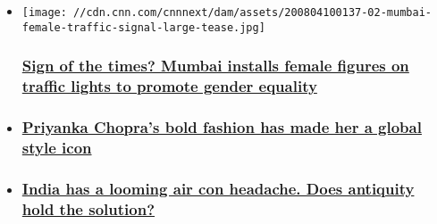 \begin{itemize}
\item
  \href{/style/article/mumbai-traffic-light-women-intl-hnk-scli/index.html}{}

  \texttt{[image: //cdn.cnn.com/cnnnext/dam/assets/200804100137-02-mumbai-female-traffic-signal-large-tease.jpg]}

  \hypertarget{sign-of-the-times-mumbai-installs-female-figures-on-traffic-lights-to-promote-gender-equality}{%
  \subsubsection{\texorpdfstring{\href{/style/article/mumbai-traffic-light-women-intl-hnk-scli/index.html}{Sign
  of the times? Mumbai installs female figures on traffic lights to
  promote gender
  equality}}{Sign of the times? Mumbai installs female figures on traffic lights to promote gender equality}}\label{sign-of-the-times-mumbai-installs-female-figures-on-traffic-lights-to-promote-gender-equality}}
\item
  \hypertarget{priyanka-chopras-bold-fashion-has-made-her-a-global-style-icon}{%
  \subsubsection{\texorpdfstring{\href{/style/article/priyanka-chopra-fashion-intl-hnk/index.html}{Priyanka
  Chopra's bold fashion has made her a global style
  icon}}{Priyanka Chopra's bold fashion has made her a global style icon}}\label{priyanka-chopras-bold-fashion-has-made-her-a-global-style-icon}}
\item
  \hypertarget{india-has-a-looming-air-con-headache-does-antiquity-hold-the-solution}{%
  \subsubsection{\texorpdfstring{\href{/style/article/india-air-conditioning-ant-studio/index.html}{India
  has a looming air con headache. Does antiquity hold the
  solution?}}{India has a looming air con headache. Does antiquity hold the solution?}}\label{india-has-a-looming-air-con-headache-does-antiquity-hold-the-solution}}
\end{itemize}

